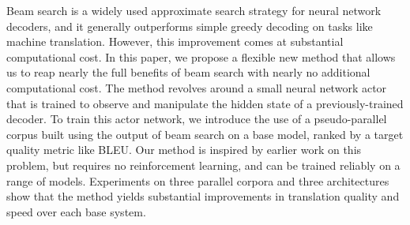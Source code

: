 Beam search is a widely used approximate search strategy for neural network decoders, and it generally outperforms simple greedy decoding on tasks like machine translation. However, this improvement comes at substantial computational cost. In this paper, we propose a flexible new method that allows us to reap nearly the full benefits of beam search with nearly no additional computational cost. The method revolves around a small neural network actor that is trained to observe and manipulate the hidden state of a previously-trained decoder. To train this actor network, we introduce the use of a pseudo-parallel corpus built using the output of beam search on a base model, ranked by a target quality metric like BLEU. Our method is inspired by earlier work on this problem, but requires no reinforcement learning, and can be trained reliably on a range of models. Experiments on three parallel corpora and three architectures show that the method yields substantial improvements in translation quality and speed over each base system.
